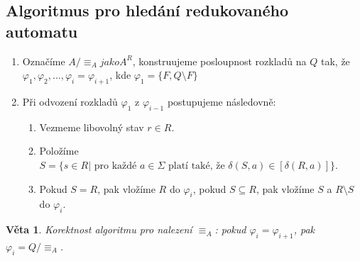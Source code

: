 \documentclass[10pt, a4paper, titlepage]{article}
\theoremstyle{note}
\newtheorem{veta}{\textbf{Věta}}
\begin{document}
\subsection{Algoritmus pro hled\'an\'i redukovan\'eho automatu}

\begin{enumerate}
\item
Označ\'ime $A/ \equiv_{A} jako A^{R}$, konstruujeme posloupnost rozkladů na $Q$ tak, že $\varphi_{1}, \varphi_{2}, \ldots, \varphi_{i} = \varphi_{i+1}$,
kde $\varphi_{1} = \lbrace F, Q \setminus F \rbrace$

\item
Při odvozen\'i rozkladů $\varphi_{1}$ z $\varphi_{i-1}$ postupujeme n\'asledovně:
\begin{enumerate}
\item
Vezmeme libovoln\'y stav $r \in R$.

\item
Polož\'ime $S = \lbrace s \in R | \text{ pro každ\'e } a \in \Sigma \text{ plat\'i tak\'e, že }\delta(S, a) \in [\delta(R, a)] \rbrace$.

\item
Pokud $S = R$, pak vlož\'ime $R$ do $\varphi_{i}$, pokud $S \subseteq R$, pak vlož\'ime $S$ a $R \setminus S$ do $\varphi_{i}$.
\end{enumerate}
\end{enumerate}

\begin{veta}
Korektnost algoritmu pro nalezen\'i $\equiv_{A}$: pokud $\varphi_{i} = \varphi_{i+1}$, pak $\varphi_{i} = Q/ \equiv_{A}$.
\end{veta}
\end{document}
